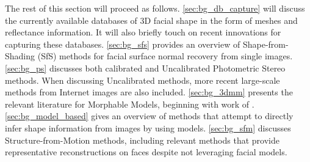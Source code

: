 The rest of this section will proceed as follows. \cref{sec:bg_db_capture} will
discuss the currently available databases of 3D facial shape in the form
of meshes and reflectance information. It will also briefly touch on recent
innovations for capturing these databases. \cref{sec:bg_sfs} provides an overview
of Shape-from-Shading (SfS) methods for facial surface normal recovery from
single images. \cref{sec:bg_ps} discusses both calibrated and
Uncalibrated Photometric Stereo methods. When discussing Uncalibrated methods,
more recent large-scale methods from Internet images are also included.
\cref{sec:bg_3dmm} presents the relevant literature for Morphable Models,
beginning with work of \citet{volker1999morphable}.
\cref{sec:bg_model_based} gives an
overview of methods that attempt to directly infer shape information from images
by using models. \cref{sec:bg_sfm} discusses Structure-from-Motion methods,
including relevant methods that provide representative reconstructions
on faces despite not leveraging facial models.






\stopcontents[chapters]
